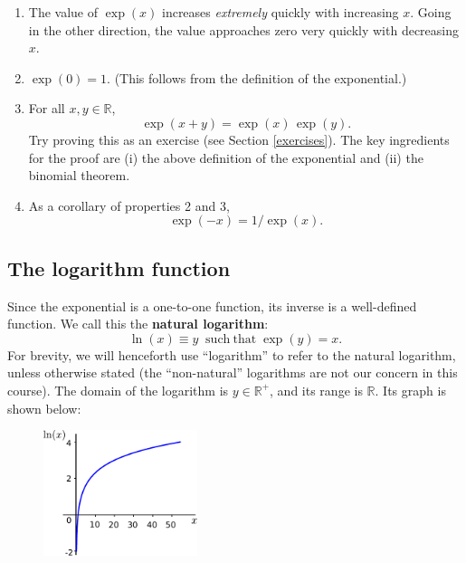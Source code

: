\documentclass[10pt,a4paper]{article}
\begin{document}
\begin{enumerate}
\item
  The value of $\exp(x)$ increases \emph{extremely} quickly with
  increasing $x$. Going in the other direction, the value approaches
  zero very quickly with decreasing $x$.
\item
  $\exp(0) = 1$. (This follows from the definition of the
  exponential.)
\item
  For all $x, y \in \mathbb{R}$,
  \begin{equation}
    \exp(x+y) = \exp(x)\,\exp(y).
    \label{eq:exponential_add}
  \end{equation}
  Try proving this as an exercise (see Section \ref{exercises}). The
  key ingredients for the proof are (i) the above definition of the
  exponential and (ii) the binomial theorem.
\item
  As a corollary of properties 2 and 3,
  \begin{equation}
    \exp(-x) = 1/\exp(x).
  \end{equation}
\end{enumerate}

\subsection{The logarithm function}
\label{the-logarithm-function}

Since the exponential is a one-to-one function, its inverse is a
well-defined function. We call this the \textbf{natural logarithm}:
\begin{equation}
  \ln(x) \equiv y \;\; \mathrm{such}~\mathrm{that}\; \exp(y) = x.
\end{equation}
For brevity, we will henceforth use ``logarithm'' to refer to the
natural logarithm, unless otherwise stated (the ``non-natural''
logarithms are not our concern in this course). The domain of the
logarithm is $y \in \mathbb{R}^+$, and its range is $\mathbb{R}$.  Its
graph is shown below:

\begin{figure}[ht]
  \centering\includegraphics[width=0.4\textwidth]{logarithm}
\end{figure}
\end{document}
